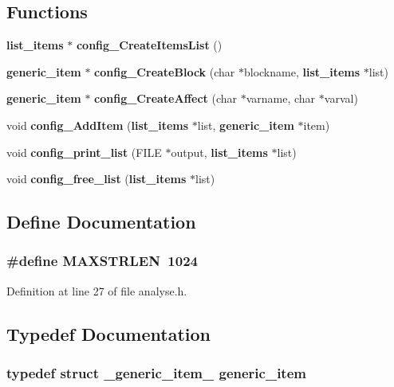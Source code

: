 \subsection*{Functions}
\begin{DoxyCompactItemize}
\item 
{\bf list\_\-items} $\ast$ {\bf config\_\-CreateItemsList} ()
\item 
{\bf generic\_\-item} $\ast$ {\bf config\_\-CreateBlock} (char $\ast$blockname, {\bf list\_\-items} $\ast$list)
\item 
{\bf generic\_\-item} $\ast$ {\bf config\_\-CreateAffect} (char $\ast$varname, char $\ast$varval)
\item 
void {\bf config\_\-AddItem} ({\bf list\_\-items} $\ast$list, {\bf generic\_\-item} $\ast$item)
\item 
void {\bf config\_\-print\_\-list} (FILE $\ast$output, {\bf list\_\-items} $\ast$list)
\item 
void {\bf config\_\-free\_\-list} ({\bf list\_\-items} $\ast$list)
\end{DoxyCompactItemize}


\subsection{Define Documentation}
\subsubsection[{MAXSTRLEN}]{\setlength{\rightskip}{0pt plus 5cm}\#define MAXSTRLEN~1024}\label{analyse_8h_ab64c24e21a46ddfe0f4168c16b882846}


Definition at line 27 of file analyse.h.

\subsection{Typedef Documentation}
\subsubsection[{generic\_\-item}]{\setlength{\rightskip}{0pt plus 5cm}typedef struct {\bf \_\-generic\_\-item\_\-}  {\bf generic\_\-item}}\label{analyse_8h_a6000e486d8247f4386926a6df782cc69}
